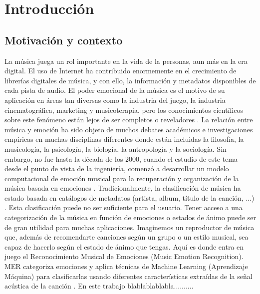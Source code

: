 \documentclass[12pt,a4paper,Spanish]{article}
\begin{document}
\newpage
\section{Introducción}
\subsection{Motivación y contexto}
La música juega un rol importante en la vida de la personas, aun más en la era digital. El uso de Internet ha contribuido enormemente en el crecimiento de librerías digitales de música, y con ello, la información y metadatos disponibles de cada pista de audio. El poder emocional de la música es el motivo de su aplicación en áreas tan diversas como la industria del juego, la industria cinematográfica, marketing y musicoterapia, pero los conocimientos científicos sobre este fenómeno están lejos de ser completos o reveladores \cite{eerola2012review}.
\newline
La relación entre música y emoción ha sido objeto de muchos debates académicos e investigaciones empíricas en muchas disciplinas diferentes donde están incluidas la filosofía, la musicología, la psicología, la biología, la antropología y la sociología. Sin embargo, no fue hasta la década de los 2000, cuando el estudio de este tema desde el punto de vista de la ingeniería, comenzó a desarrollar un modelo computacional de emoción musical para la recuperación y organización de la música basada en emociones \cite{yang2011music}.
\newline
Tradicionalmente, la clasificación de música ha estado basada en catálogos de metadatos (artista, album, título de la canción, ...) \cite{yang2011music}. Esta clasificación puede no ser suficiente para el usuario. Tener acceso a una categorización de la música en función de emociones o estados de ánimo puede ser de gran utilidad para muchas aplicaciones. Imaginemos un reproductor de música que, además de recomendarte canciones según un grupo o un estilo musical, sea capaz de hacerlo según el estado de ánimo que tengas.
\newline
Aquí es donde entra en juego el Reconocimiento Musical de Emociones (Music Emotion Recognition). MER categoriza emociones y aplica técnicas de Machine Learning (Aprendizaje Máquina) para clasificarlas usando diferentes características extraídas de la señal acústica de la canción \cite{yang2011music}.
\newline
En este trabajo blablablablabla..........
\end{document}
